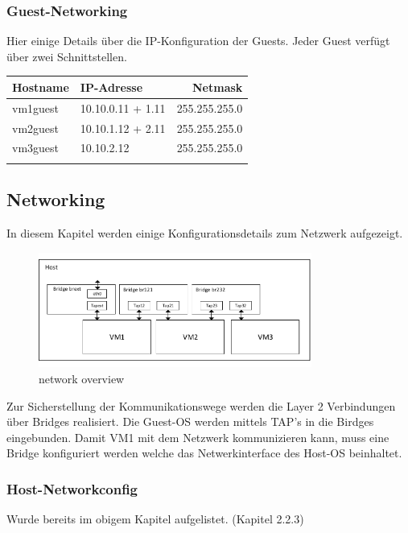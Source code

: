 \documentclass[a4,12pt]{scrartcl}
\begin{document}
\subsubsection{Guest-Networking}
Hier einige Details über die IP-Konfiguration der Guests. Jeder Guest verfügt über zwei Schnittstellen.  
\begin{center}
    \begin{tabular}{@{} l l r@{}}\toprule    
    {Hostname} & {IP-Adresse} & {Netmask}\\ \toprule
    vm1guest & 10.10.0.11 + 1.11 & 255.255.255.0\\ 
    vm2guest & 10.10.1.12 + 2.11 & 255.255.255.0\\
    vm3guest & 10.10.2.12 & 255.255.255.0\\ \addlinespace
    \bottomrule
    \end{tabular}
\end{center}

\subsection{Networking}
In diesem Kapitel werden einige Konfigurationsdetails zum Netzwerk aufgezeigt.
\begin{figure} [H]
	\begin{center}
	\includegraphics[width=0.80\textwidth]{./draws/uebersicht_bridges_taps_visio.pdf}
	\caption{{network overview}}
	\label{virtualdir}
	\end{center}
\end{figure}

\noindent Zur Sicherstellung der Kommunikationswege werden die Layer 2 Verbindungen über Bridges realisiert. Die Guest-OS werden mittels TAP's in die Birdges eingebunden. Damit VM1 mit dem Netzwerk kommunizieren kann, muss eine Bridge konfiguriert werden welche das Netwerkinterface  des Host-OS beinhaltet.

\subsubsection{Host-Networkconfig}
Wurde bereits im obigem Kapitel aufgelistet. (Kapitel 2.2.3)
 
\end{document}
